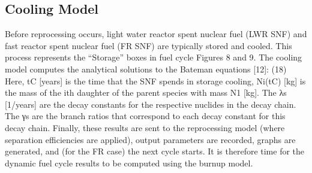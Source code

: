 \subsection{Cooling Model}
\label{1g_sec:cool_model}
Before reprocessing occurs, light water reactor spent nuclear fuel (LWR SNF) and fast reactor spent nuclear fuel (FR SNF) are typically stored and cooled.  This process represents the “Storage” boxes in fuel cycle Figures 8 and 9.  The cooling model computes the analytical solutions to the Bateman equations [12]: 
        (18)
Here, tC [years] is the time that the SNF spends in storage cooling,  Ni(tC) [kg] is the mass of the ith daughter of the parent species with mass N1 [kg]. The λs [1/years] are the decay constants for the respective nuclides in the decay chain.   The γs are the branch ratios that correspond to each decay constant for this decay chain.  
Finally, these results are sent to the reprocessing model (where separation efficiencies are applied), output parameters are recorded, graphs are generated, and (for the FR case) the next cycle starts.   It is therefore time for the dynamic fuel cycle results to be computed using the burnup model.





